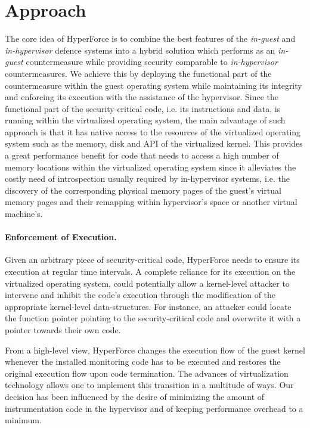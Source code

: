 \section{Approach}\label{hf:approach}
The core idea of HyperForce is to combine the best features of the \textit{in-guest} and \textit{in-hypervisor} defence systems into a hybrid solution which performs as an \textit{in-guest} countermeasure while providing security comparable to \textit{in-hypervisor} countermeasures. 
We achieve this by deploying the functional part of the countermeasure within the guest operating system while maintaining its integrity and enforcing its execution with the assistance of the hypervisor. Since the functional part of the security-critical code, i.e. its instructions and data, is running within the virtualized operating system, the main advantage of such approach is that it has native access to the resources of the virtualized operating system such as the memory, disk and API of the virtualized kernel. 
This provides a great performance benefit for code that needs to access a high number of memory locations within the virtualized operating system since it alleviates the costly need of introspection usually required by in-hypervisor systems, i.e. the discovery of the corresponding physical memory pages of the guest's virtual memory pages and their remapping within hypervisor's space or another virtual machine's. 

\paragraph{Enforcement of Execution.}
Given an arbitrary piece of security-critical code, HyperForce needs to ensure its execution at regular time intervals. A complete reliance for its execution on the virtualized operating system, could potentially allow a kernel-level attacker to intervene and inhibit the code's execution through the modification of the appropriate kernel-level data-structures. For instance, an attacker could locate the function pointer pointing to the security-critical code and overwrite it with a pointer towards their own code.

From a high-level view, HyperForce changes the execution flow of the guest kernel whenever the installed monitoring code has to be executed and restores the original execution flow upon code termination. 
The advances of virtualization technology allows one to implement this transition in a multitude of ways. Our decision has been influenced by the desire of minimizing the amount of instrumentation code in the hypervisor and of keeping performance overhead to a minimum.

